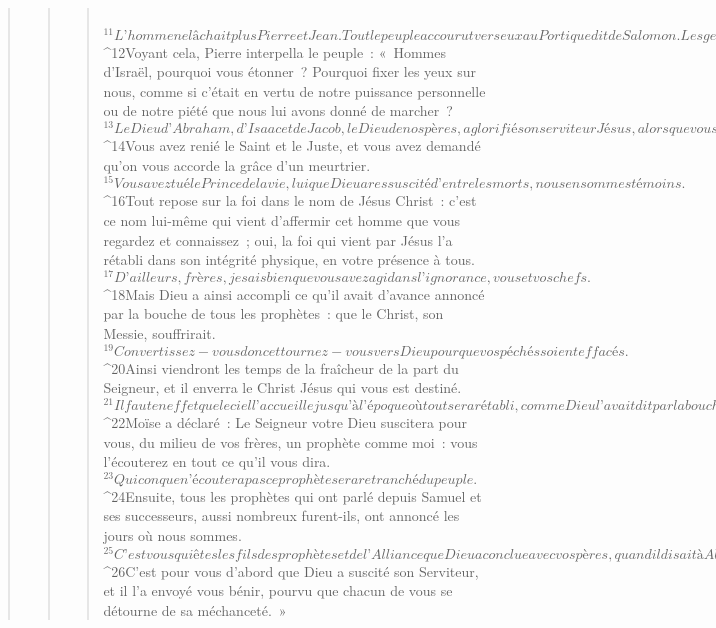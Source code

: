 \begin{verse}
\begin{verse}
\begin{verse}
         
${}^{11}L’homme ne lâchait plus Pierre et Jean. Tout le peuple accourut vers eux au Portique dit de Salomon. Les gens étaient stupéfaits. 
${}^{12}Voyant cela, Pierre interpella le peuple : « Hommes d’Israël, pourquoi vous étonner ? Pourquoi fixer les yeux sur nous, comme si c’était en vertu de notre puissance personnelle ou de notre piété que nous lui avons donné de marcher ? 
${}^{13}Le Dieu d’Abraham, d’Isaac et de Jacob, le Dieu de nos pères, a glorifié son serviteur Jésus, alors que vous, vous l’aviez livré, vous l’aviez renié en présence de Pilate qui était décidé à le relâcher. 
${}^{14}Vous avez renié le Saint et le Juste, et vous avez demandé qu’on vous accorde la grâce d’un meurtrier. 
${}^{15}Vous avez tué le Prince de la vie, lui que Dieu a ressuscité d’entre les morts, nous en sommes témoins. 
${}^{16}Tout repose sur la foi dans le nom de Jésus Christ : c’est ce nom lui-même qui vient d’affermir cet homme que vous regardez et connaissez ; oui, la foi qui vient par Jésus l’a rétabli dans son intégrité physique, en votre présence à tous.
${}^{17}D’ailleurs, frères, je sais bien que vous avez agi dans l’ignorance, vous et vos chefs. 
${}^{18}Mais Dieu a ainsi accompli ce qu’il avait d’avance annoncé par la bouche de tous les prophètes : que le Christ, son Messie, souffrirait. 
${}^{19}Convertissez-vous donc et tournez-vous vers Dieu pour que vos péchés soient effacés. 
${}^{20}Ainsi viendront les temps de la fraîcheur de la part du Seigneur, et il enverra le Christ Jésus qui vous est destiné. 
${}^{21}Il faut en effet que le ciel l’accueille jusqu’à l’époque où tout sera rétabli, comme Dieu l’avait dit par la bouche des saints, ceux d’autrefois, ses prophètes. 
${}^{22}Moïse a déclaré : Le Seigneur votre Dieu suscitera pour vous, du milieu de vos frères, un prophète comme moi : vous l’écouterez en tout ce qu’il vous dira. 
${}^{23}Quiconque n’écoutera pas ce prophète sera retranché du peuple. 
${}^{24}Ensuite, tous les prophètes qui ont parlé depuis Samuel et ses successeurs, aussi nombreux furent-ils, ont annoncé les jours où nous sommes. 
${}^{25}C’est vous qui êtes les fils des prophètes et de l’Alliance que Dieu a conclue avec vos pères, quand il disait à Abraham : En ta descendance seront bénies toutes les familles de la terre. 
${}^{26}C’est pour vous d’abord que Dieu a suscité son Serviteur, et il l’a envoyé vous bénir, pourvu que chacun de vous se détourne de sa méchanceté. »
      

\end{verse}
\end{verse}
\end{verse}
